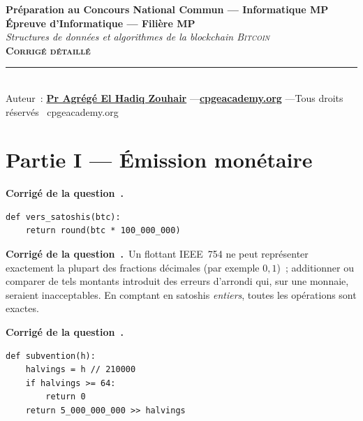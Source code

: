 \documentclass[11pt,a4paper]{article}
\newcounter{qcnt}
\newcommand{\Q}{\medskip\par\stepcounter{qcnt}\noindent\textbf{Corrigé de la question~\theqcnt.}~}
\begin{document}
\begin{center}
{\large\bfseries Préparation au Concours National Commun --- Informatique MP}\\[6pt]
{\Large\bfseries Épreuve d'Informatique --- Filière MP}\\[3pt]
{\itshape Structures de données et algorithmes de la blockchain \textsc{Bitcoin}}\\[3pt]
{\bfseries\scshape Corrigé détaillé}\\[6pt]
\rule{0.9\linewidth}{0.5pt}\\[6pt]
{\small Auteur~: \href{https://orcid.org/0000-0002-6108-7176}{\textbf{Pr Agrégé El Hadiq Zouhair}} \quad---\quad \href{https://cpgeacademy.org}{\textbf{cpgeacademy.org}} \quad---\quad Tous droits réservés \textcopyright\ cpgeacademy.org}
\end{center}

\smallskip
\begin{center}
\end{center}

\section*{Partie I --- Émission monétaire}

\Q
\begin{lstlisting}
def vers_satoshis(btc):
    return round(btc * 100_000_000)
\end{lstlisting}

\Q Un flottant IEEE~754 ne peut représenter exactement la plupart des fractions décimales (par exemple $0{,}1$)~; additionner ou comparer de tels montants introduit des erreurs d'arrondi qui, sur une monnaie, seraient inacceptables. En comptant en satoshis \emph{entiers}, toutes les opérations sont exactes.

\Q
\begin{lstlisting}
def subvention(h):
    halvings = h // 210000
    if halvings >= 64:
        return 0
    return 5_000_000_000 >> halvings
\end{lstlisting}
\end{document}
